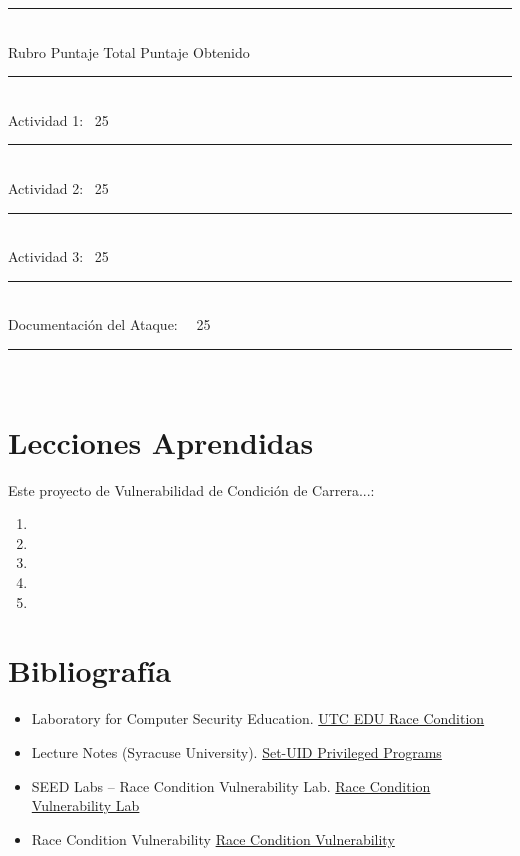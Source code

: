 \documentclass{article}
\begin{document}
    \noindent\rule{10cm}{0.4pt} \\
    Rubro   \qquad \qquad \qquad \qquad Puntaje Total    \qquad  Puntaje Obtenido \\
    \noindent\rule{10cm}{0.4pt} \\
    Actividad 1: \qquad \qquad \qquad \qquad \ 25 \qquad \\ 
    \noindent\rule{10cm}{0.1pt} \\
    Actividad 2: \qquad \qquad \qquad \qquad \ 25 \qquad \\ 
    \noindent\rule{10cm}{0.1pt} \\
    Actividad 3: \qquad \qquad \qquad \qquad \ 25 \qquad \\ 
    \noindent\rule{10cm}{0.1pt} \\
    Documentación del Ataque: \quad \ \ 25 \qquad \\ 
    \noindent\rule{10cm}{0.1pt} \\

\section*{Lecciones Aprendidas}

Este proyecto de Vulnerabilidad de Condición de Carrera...:

\begin{enumerate}
    \item     
    \item     
    \item     
    \item 
    \item 
    
\end{enumerate}

\section*{Bibliografía}

\begin{itemize}
  \item Laboratory for Computer Security Education. \href{https://www.utc.edu/sites/default/files/2021-04/race-condition.pdf}{UTC EDU Race Condition}
  
  \item Lecture Notes (Syracuse University). \href{https://web.ecs.syr.edu/~wedu/Teaching/cis643/LectureNotes_New/Set_UID.pdf}{Set-UID Privileged Programs}
  
  \item SEED Labs – Race Condition Vulnerability Lab. \href{https://seedsecuritylabs.org/Labs_16.04/PDF/Race_Condition_new.pdf}{Race Condition Vulnerability Lab}
  
  \item Race Condition Vulnerability \href{https://moodle1920.up.pt/pluginfile.php/132925/mod_resource/content/1/Race_Condition_Extra.pdf}{Race Condition Vulnerability}
  
\end{itemize}
\end{document}
